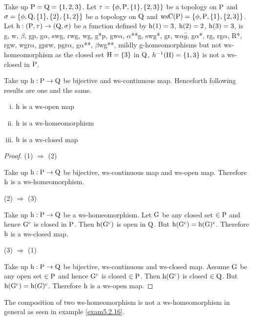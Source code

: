 \begin{exm}\label{exm5.2.13}
Take up $\mathrm{P}=\mathrm{Q}= \{1, 2, 3\}$. Let $\tau= \{\phi, \mathrm{P}, \{1\}, \{2,3\}\}$ be a topology on $\mathrm{P}$ and $\sigma=\{\phi, \mathrm{Q}, \{1\},\{2\}, \{1,2\}\}$ be a topology on $\mathrm{Q}$ and $\mathrm{ws}\mathrm{C}(\mathrm{P})= \{\phi, \mathrm{P},\{1\},\{2,3\}\}$. Let $\mathrm{h}: (\mathrm{P}, \tau )\to (\mathrm{Q}, \sigma)$ be a function defined by $\mathrm{h}(1)=3$, $\mathrm{h}(2)= 2$, $\mathrm{h}(3)=3$, is g, w, $\beta$, gp, g$\alpha$, swg, rwg, wg, g*p, gw$\alpha$, $\alpha${*}{*}g, swg*, gr, w$\alpha\hat{g}$, g$\alpha$*, rg, rg$\alpha$, R*, rgw, wgr$\alpha$, gprw, pgr$\alpha$, g$\alpha${*}{*}, $\beta$wg{*}{*}, mildly g-homeomorphisms but not ws-homeomorphism as the closed set $\mathrm{H}=\{3\}$ in $\mathrm{Q}$, $h^{-1} (\mathrm{H})=\{1,3\}$ is not a ws-closed in $\mathrm{P}$.
\end{exm}

\begin{thm}\label{thm5.2.14}
Take up $\mathrm{h}: \mathrm{P}\to \mathrm{Q}$ be bijective and ws-continuous map. Henceforth following results are one and the same.
\begin{enumerate}[(i)]
\item $\mathrm{h}$ is a ws-open map
\item $\mathrm{h}$ is a ws-homeomorphism
\item $\mathrm{h}$ is a ws-closed map
\end{enumerate}
\end{thm}

\begin{proof}
(1) $\Rightarrow$ (2)

Take up $\mathrm{h}: \mathrm{P}\to \mathrm{Q}$ be bijective, ws-continuous map and ws-open map. Therefore $\mathrm{h}$ is a ws-homeomorphism.

(2) $\Rightarrow$ (3)

Take up $\mathrm{h}: \mathrm{P}\to \mathrm{Q}$ be a ws-homeomorphism. Let $\mathrm{G}$ be any closed set $\in \mathrm{P}$ and hence $\mathrm{G}^{\text{c}}$ is closed in $\mathrm{P}$. Then $\mathrm{h}(\mathrm{G}^{\text{c}})$ is open in $\mathrm{Q}$. But $\mathrm{h}(\mathrm{G}^{\text{c}})=\mathrm{h}(\mathrm{G})^{\text{c}}$. Therefore $\mathrm{h}$ is a ws-closed map.

(3) $\Rightarrow$ (1)

Take up $\mathrm{h}: \mathrm{P}\to \mathrm{Q}$ be bijective, ws-continuous and ws-closed map. Assume $\mathrm{G}$ be any open set $\in \mathrm{P}$ and hence $\mathrm{G}^{\text{c}}$ is closed $\in \mathrm{P}$. Then $\mathrm{h}(\mathrm{G}^{\text{c}})$ is closed $\in \mathrm{Q}$. But $\mathrm{h}(\mathrm{G}^{\text{c}})=\mathrm{h}(G)^{\text{c}}$. Therefore $\mathrm{h}$ is a ws-open map.
\end{proof}

\begin{rem}\label{rem5.2.15}
The composition of two ws-homeomorphism is not a ws-homeomor\-phism in general as seen in example \ref{exam5.2.16}.
\end{rem}

